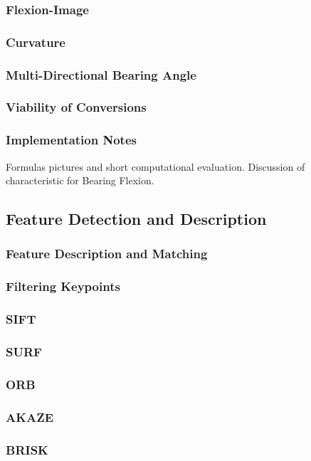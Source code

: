 \subsubsection{Flexion-Image}
\subsubsection{Curvature}
\subsubsection{Multi-Directional Bearing Angle}
\subsubsection{Viability of Conversions}
\subsubsection{Implementation Notes}

Formulas pictures and short computational evaluation.
Discussion of characteristic for Bearing Flexion.

\subsection{Feature Detection and Description}
\subsubsection{Feature Description and Matching}
\subsubsection{Filtering Keypoints}
\subsubsection{SIFT}
\subsubsection{SURF}
\subsubsection{ORB}
\subsubsection{AKAZE}
\subsubsection{BRISK}

